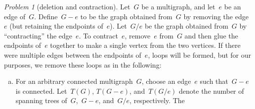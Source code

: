 \documentclass[11pt,twoside]{amsart}
\theoremstyle{plain}
\theoremstyle{remark}
\newtheorem{prob}{Problem}
\theoremstyle{definition}
\theoremstyle{definition}
\begin{document}
\begin{prob}[deletion and contraction]\label{prob: deletion/contraction}
  Let~$G$ be a multigraph, and let~$e$ be an edge of~$G$.  Define~$G-e$ to be
  the graph obtained from~$G$ by removing the edge~$e$ (but retaining the
  endpoints of~$e$).  Let~$G/e$ be the graph obtained from~$G$ by
  ``contracting'' the edge~$e$.  To contract~$e$, remove~$e$ from~$G$ and then
  glue the endpoints of~$e$ together to make a single vertex from the two
  vertices.  If there were multiple edges between the endpoints of~$e$, loops
  will be formed, but for our purposes, we remove these loops as in the following:
  \begin{center}
  \end{center}
  \begin{enumerate}[(a)]
    \item For an arbitrary connected multigraph~$G$, choose an edge~$e$ such
      that~$G-e$ is connected. Let~$T(G)$, $T(G-e)$, and~$T(G/e)$ denote the
      number of spanning trees of~$G$,~$G-e$, and~$G/e$, respectively.  The

\end{enumerate}
\end{prob}
\end{document}
